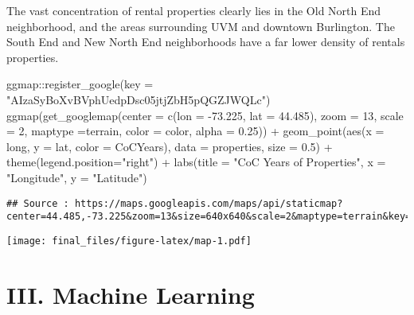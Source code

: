\documentclass[
]{article}
\newenvironment{Shaded}{\begin{snugshade}}{\end{snugshade}}
\newcommand{\AttributeTok}[1]{\textcolor[rgb]{0.77,0.63,0.00}{#1}}
\newcommand{\DecValTok}[1]{\textcolor[rgb]{0.00,0.00,0.81}{#1}}
\newcommand{\FloatTok}[1]{\textcolor[rgb]{0.00,0.00,0.81}{#1}}
\newcommand{\FunctionTok}[1]{\textcolor[rgb]{0.00,0.00,0.00}{#1}}
\newcommand{\NormalTok}[1]{#1}
\newcommand{\SpecialCharTok}[1]{\textcolor[rgb]{0.00,0.00,0.00}{#1}}
\newcommand{\StringTok}[1]{\textcolor[rgb]{0.31,0.60,0.02}{#1}}
\begin{document}
The vast concentration of rental properties clearly lies in the Old
North End neighborhood, and the areas surrounding UVM and downtown
Burlington. The South End and New North End neighborhoods have a far
lower density of rentals properties.

\begin{Shaded}
\begin{Highlighting}[]
\NormalTok{ggmap}\SpecialCharTok{::}\FunctionTok{register\_google}\NormalTok{(}\AttributeTok{key =} \StringTok{"AIzaSyBoXvBVphUedpDsc05jtjZbH5pQGZJWQLc"}\NormalTok{)}
\FunctionTok{ggmap}\NormalTok{(}\FunctionTok{get\_googlemap}\NormalTok{(}\AttributeTok{center =} \FunctionTok{c}\NormalTok{(}\AttributeTok{lon =} \SpecialCharTok{{-}}\FloatTok{73.225}\NormalTok{, }\AttributeTok{lat =} \FloatTok{44.485}\NormalTok{),}
                    \AttributeTok{zoom =} \DecValTok{13}\NormalTok{, }\AttributeTok{scale =} \DecValTok{2}\NormalTok{, }
                    \AttributeTok{maptype =}\StringTok{\textquotesingle{}terrain\textquotesingle{}}\NormalTok{,}
                    \AttributeTok{color =} \StringTok{\textquotesingle{}color\textquotesingle{}}\NormalTok{,}
                    \AttributeTok{alpha =} \FloatTok{0.25}\NormalTok{)) }\SpecialCharTok{+}
  \FunctionTok{geom\_point}\NormalTok{(}\FunctionTok{aes}\NormalTok{(}\AttributeTok{x =}\NormalTok{ long, }\AttributeTok{y =}\NormalTok{ lat,  }
                 \AttributeTok{color =}\NormalTok{ CoCYears), }\AttributeTok{data =}\NormalTok{ properties, }\AttributeTok{size =} \FloatTok{0.5}\NormalTok{) }\SpecialCharTok{+} 
  \FunctionTok{theme}\NormalTok{(}\AttributeTok{legend.position=}\StringTok{"right"}\NormalTok{) }\SpecialCharTok{+}
  \FunctionTok{labs}\NormalTok{(}\AttributeTok{title =} \StringTok{"CoC Years of Properties"}\NormalTok{, }\AttributeTok{x =} \StringTok{"Longitude"}\NormalTok{, }\AttributeTok{y =} \StringTok{"Latitude"}\NormalTok{)}
\end{Highlighting}
\end{Shaded}

\begin{verbatim}
## Source : https://maps.googleapis.com/maps/api/staticmap?center=44.485,-73.225&zoom=13&size=640x640&scale=2&maptype=terrain&key=xxx
\end{verbatim}

\texttt{[image: final\_files/figure-latex/map-1.pdf]}

\hypertarget{iii.-machine-learning}{%
\section{III. Machine Learning}\label{iii.-machine-learning}}
\end{document}

